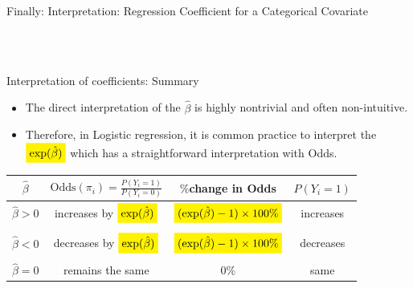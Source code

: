 \documentclass[compress]{beamer}
\begin{document}
\begin{frame}{Finally:  Interpretation:  Regression Coefficient for a Categorical Covariate}

\vspace{.01in } 
\\
 \hspace{-.4in}\\
 \pause
 
\end{frame}





\begin{frame}

\end{frame}
%
%
\begin{frame}{Interpretation of coefficients: Summary}
	\vspace{-3mm}
\begin{itemize}
	\item
	The direct interpretation of the $\hat{\beta}$ is highly nontrivial and often non-intuitive. 
 	\item 
	Therefore, in Logistic regression, it is common practice  to interpret the  $\HLTY{\exp(\hat{{\beta}})}$ which has a straightforward interpretation with Odds. 
\end{itemize}
\begin{table}[ht]
	\centering
	\begin{tabular}{cccc}
	\hline
 $\hat{{\beta}}$ &  $\text{Odds}(\pi_i)=\frac{P(Y_i = 1)}{P(Y_i = 0)}$ & $\% $change in Odds &  $P(Y_i = 1)$\\ 
	\hline
$\hat{{\beta}}> 0$ & increases by $\HLTY{\exp(\hat{{\beta}})}$ &  $\HLTY{\tiny (\exp(\hat{{\beta}})-1)\times 100\%}$  & increases \\& & &  \\
$\hat{{\beta}}< 0$ & decreases by $\HLTY{\exp(\hat{{\beta}})}$& $\HLTY{\tiny (\exp(\hat{{\beta}})-1)\times 100\%}$  &  decreases\\& & &  \\
$\hat{{\beta}} = 0$ &remains the  same &  $0\%$ &  same \\
	\hline
	\end{tabular}
\end{table}
\end{frame}
\end{document}
